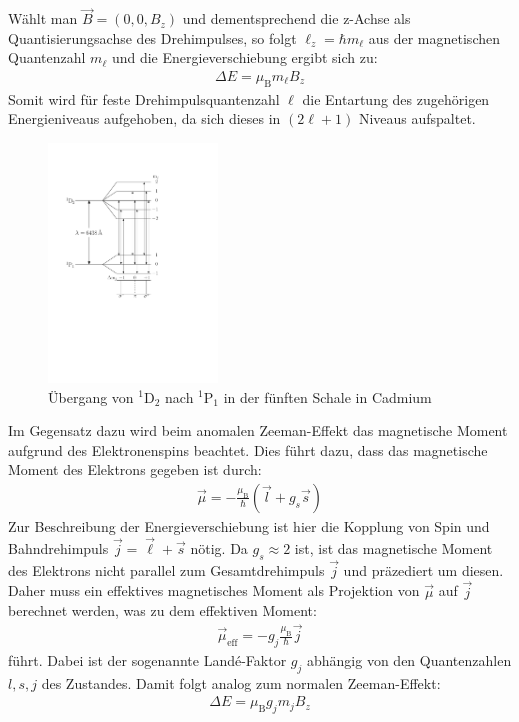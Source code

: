 \documentclass[11pt, a4paper]{article}
\begin{document}
Wählt man $\vec{B} = (0,0,B_z)$ und dementsprechend die z-Achse als Quantisierungsachse des Drehimpulses, so folgt $\ell_z = \hbar m_\ell$ aus der magnetischen Quantenzahl $m_\ell$ und die Energieverschiebung ergibt sich zu:
\begin{align}
	\Delta E = \mu_\mathrm{B} m_\ell B_z
	\label{eq:normaler_zeeman}
\end{align}
Somit wird für feste Drehimpulsquantenzahl $\ell$ die Entartung des zugehörigen Energieniveaus aufgehoben, da sich dieses in $(2\ell + 1)$ Niveaus aufspaltet.
\begin{figure}[h]
\centering
\includegraphics[width=0.4\textwidth]{./figures/termschema_cadmium.pdf}
\caption{Übergang von $^1$D$_2$ nach $^1$P$_1$ in der fünften Schale in Cadmium}
\label{fig:termschema_cadmium}
\end{figure}
Im Gegensatz dazu wird beim anomalen Zeeman-Effekt das magnetische Moment aufgrund des Elektronenspins beachtet.
Dies führt dazu, dass das magnetische Moment des Elektrons gegeben ist durch:
\begin{align}
\vec{\mu} = -\frac{\mu_\mathrm{B}}{\hbar} \left( \vec{l} + g_s \vec{s} \right)
\label{eq:magmom_spin}
\end{align}
Zur Beschreibung der Energieverschiebung ist hier die Kopplung von Spin und Bahndrehimpuls $\vec{j} = \vec{\ell} + \vec{s}$ nötig.
Da $g_s \approx 2$ ist, ist das magnetische Moment des Elektrons nicht parallel zum Gesamtdrehimpuls $\vec{j}$ und präzediert um diesen.
Daher muss ein effektives magnetisches Moment als Projektion von $\vec{\mu}$ auf $\vec{j}$ berechnet werden, was zu dem effektiven Moment:
\begin{align*}
	\vec{\mu}_\mathrm{eff} = - g_j \frac{\mu_\mathrm{B}}{\hbar} \vec{j} 
\end{align*}
führt.
Dabei ist der sogenannte Landé-Faktor $g_j$ abhängig von den Quantenzahlen $l,s,j$ des Zustandes.
Damit folgt analog zum normalen Zeeman-Effekt:
\begin{align}
	\Delta E = \mu_\mathrm{B} g_j m_j B_z
\end{align}
\end{document}
